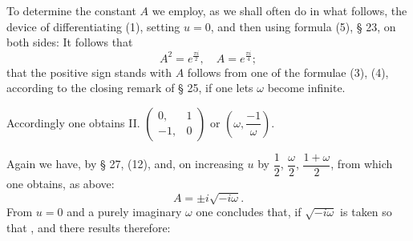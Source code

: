 To determine the constant $A$ we employ, as we shall often do in what follows, the device of differentiating (1), setting $u = 0$, and then using formula (5), § 23, on both sides:
It follows that
\[
A^2 = e^{\frac{\pi i}{2}}, \quad A = e^{\frac{\pi i}{4}};
\]
that the positive sign stands with $A$ follows from one of the formulae (3), (4), according to the closing remark of § 25, if one lets $\omega$ become infinite.

Accordingly one obtains
II. $\begin{pmatrix} 0, & 1 \\ -1, & 0 \end{pmatrix}$ or $\left(\omega, \dfrac{-1}{\omega}\right)$.

Again we have, by § 27, (12),
and, on increasing $u$ by $\dfrac{1}{2}$, $\dfrac{\omega}{2}$, $\dfrac{1+\omega}{2}$,
from which one obtains, as above:
\[
A = \pm i\sqrt{-i\omega}.
\]
From $u = 0$ and a purely imaginary $\omega$ one concludes that, if $\sqrt{-i\omega}$ is taken so that , and there results therefore:
